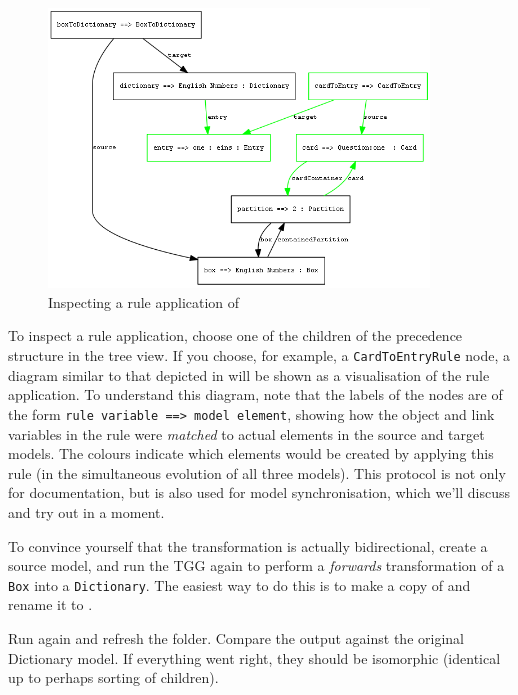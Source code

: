 \begin{stepbystep}
\begin{figure}[htb]
\begin{center}
  \includegraphics[width=0.9\textwidth]{../../org.moflon.doc.handbook.04_tripleGraphTransformations/5_inAction/aImages/eclipse_ruleApplication}
  \caption{Inspecting a rule application of }
  \label{eclipse_ruleApplication}
\end{center}
\end{figure}

\item To inspect a rule application, choose one of the children of the precedence structure in the tree view.
If you choose, for example, a \texttt{Card\-To\-Entry\-Rule} node, a diagram similar to that depicted in  will be shown as a visualisation of the rule application.
To understand this diagram, note that the labels of the nodes are of the form \texttt{rule variable ==> model element}, showing how the object and link variables in the rule were \emph{matched} to actual elements in the source and target models.
The colours indicate which elements would be created by applying this rule (in the simultaneous evolution of all three models).
This protocol is not only for documentation, but is also used for model synchronisation, which we'll discuss and try out in a moment.

\item To convince yourself that the transformation is actually bidirectional, create a source model, and run the TGG again to perform a \emph{forwards} transformation of a \texttt{Box} into a \texttt{Dictionary}.
The easiest way to do this is to make a copy of  and rename
it to .

\item Run  again and refresh the  folder. 
Compare the output  against the original  Dictionary model. 
If everything went right, they should be isomorphic (identical up to perhaps sorting of children).
\end{stepbystep}
